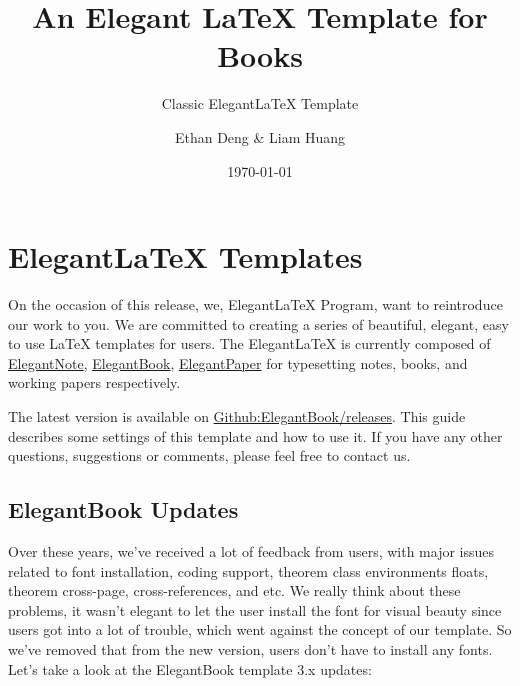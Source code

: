 \documentclass[noanswer,fancy,blue,11pt]{elegantbook}
\title{An Elegant \LaTeX{} Template for Books}
\subtitle{Classic Elegant\LaTeX{} Template}
\author{Ethan Deng \& Liam Huang}
\institute{Elegant\LaTeX{} Program}
\date{\today}
\begin{document}
\maketitle
\tableofcontents
\clearpage
\thispagestyle{empty}
\mainmatter
\hypersetup{pageanchor=true}

\chapter{Elegant\LaTeX{} Templates}

On the occasion of this release, we, Elegant\LaTeX{} Program, want to reintroduce our work to you. We are committed to creating a series of beautiful, elegant, easy to use \LaTeX{} templates for users. The Elegant\LaTeX{} is currently composed of \href{https://github.com/ElegantLaTeX/ElegantNote}{ElegantNote}, \href{https://github.com/ElegantLaTeX/ElegantBook}{ElegantBook}, \href{https://github.com/ElegantLaTeX/ElegantPaper}{ElegantPaper} for typesetting notes, books, and working papers respectively. 

The latest version is available on \href{https://github.com/ElegantLaTeX/ElegantBook/releases}{Github:ElegantBook/releases}. This guide describes some settings of this template and how to use it. If you have any other questions, suggestions or comments, please feel free to contact us.


\section{ElegantBook Updates}
Over these years, we've received \cite{EINAV2010} a lot of feedback from users, with major issues related to font installation, coding support, theorem class environments floats, theorem cross-page, cross-references, and etc. We really think about these problems, it wasn't elegant to let the user install the font for visual beauty since users got into a lot of trouble, which went against the concept of our template. So we've removed that from the new version, users don't have to install any fonts. Let's take a look at the ElegantBook template 3.x updates:
\end{document}
